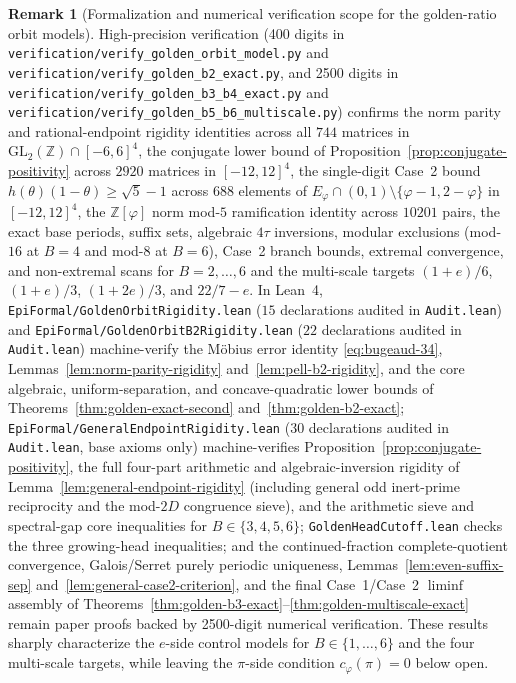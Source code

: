 \documentclass[11pt]{amsart}
\theoremstyle{definition}
\newtheorem{remark}[theorem]{Remark}
\theoremstyle{remark}
\numberwithin{equation}{section}
\newcommand{\Z}{\mathbb{Z}}
\begin{document}
\begin{remark}[Formalization and numerical verification scope for the golden-ratio orbit models]\label{rem:golden-b2-model}
High-precision verification (400 digits in
\texttt{verification/\allowbreak{}verify\_\allowbreak{}golden\_\allowbreak{}orbit\_\allowbreak{}model.py}
and \texttt{verification/\allowbreak{}verify\_\allowbreak{}golden\_\allowbreak{}b2\_\allowbreak{}exact.py},
and 2500 digits in
\texttt{verification/\allowbreak{}verify\_\allowbreak{}golden\_\allowbreak{}b3\_\allowbreak{}b4\_\allowbreak{}exact.py}
and \texttt{verification/\allowbreak{}verify\_\allowbreak{}golden\_\allowbreak{}b5\_\allowbreak{}b6\_\allowbreak{}multiscale.py})
confirms the norm parity and rational-endpoint rigidity identities across
all $744$ matrices in $\mathrm{GL}_2(\Z)\cap[-6,6]^4$, the conjugate lower
bound of Proposition~\ref{prop:conjugate-positivity} across $2920$ matrices in
$[-12,12]^4$, the single-digit Case~2 bound $h(\theta)(1-\theta)\ge\sqrt5-1$
across $688$ elements of $E_\varphi\cap(0,1)\setminus\{\varphi-1,2-\varphi\}$
in $[-12,12]^4$, the $\Z[\varphi]$ norm mod-$5$ ramification identity across
$10201$ pairs, the exact base periods, suffix sets, algebraic $4\tau$
inversions, modular exclusions (mod-$16$ at $B=4$ and mod-$8$ at $B=6$),
Case~2 branch bounds, extremal convergence, and non-extremal scans for
$B=2,\dots,6$ and the multi-scale targets $(1+e)/6$, $(1+e)/3$, $(1+2e)/3$,
and $22/7-e$. In Lean~4,
\texttt{EpiFormal/\allowbreak{}GoldenOrbit\allowbreak{}Rigidity.lean}
($15$ declarations audited in \texttt{Audit.lean}) and
\texttt{EpiFormal/\allowbreak{}GoldenOrbit\allowbreak{}B2Rigidity.lean}
($22$ declarations audited in \texttt{Audit.lean})
machine-verify the M\"obius error identity \eqref{eq:bugeaud-34},
Lemmas~\ref{lem:norm-parity-rigidity} and~\ref{lem:pell-b2-rigidity}, and
the core algebraic, uniform-separation, and concave-quadratic lower bounds of
Theorems~\ref{thm:golden-exact-second} and~\ref{thm:golden-b2-exact};
\texttt{EpiFormal/\allowbreak{}GeneralEndpoint\allowbreak{}Rigidity.lean}
($30$ declarations audited in \texttt{Audit.lean}, base axioms only)
machine-verifies Proposition~\ref{prop:conjugate-positivity}, the full
four-part arithmetic and algebraic-inversion rigidity of
Lemma~\ref{lem:general-endpoint-rigidity} (including general odd inert-prime
reciprocity and the mod-$2D$ congruence sieve), and the arithmetic sieve and
spectral-gap core inequalities for $B\in\{3,4,5,6\}$;
\texttt{GoldenHeadCutoff.lean} checks the three growing-head inequalities;
and the continued-fraction complete-quotient convergence, Galois/Serret purely
periodic uniqueness,
Lemmas~\ref{lem:even-suffix-sep} and~\ref{lem:general-case2-criterion},
and the final Case~1/Case~2 $\liminf$ assembly of
Theorems~\ref{thm:golden-b3-exact}--\ref{thm:golden-multiscale-exact} remain
paper proofs backed by 2500-digit numerical verification.
These results sharply characterize the $e$-side control models for
$B\in\{1,\dots,6\}$ and the four multi-scale targets, while leaving the
$\pi$-side condition $c_\varphi(\pi)=0$ below open.
\end{remark}
\end{document}
